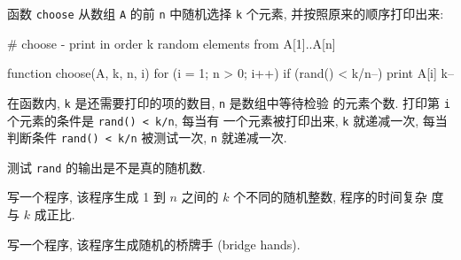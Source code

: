 函数 \texttt{choose} 从数组 \texttt{A} 的前 \texttt{n} 中随机选择
\texttt{k} 个元素, 并按照原来的顺序打印出来:
\begin{awkcode}
    # choose - print in order k random elements from A[1]..A[n]

    function choose(A, k, n,    i) {
        for (i = 1; n > 0; i++)
            if (rand() < k/n--) {
                print A[i]
                k--
            }
    }
\end{awkcode}
在函数内, \texttt{k} 是还需要打印的项的数目, \texttt{n} 是数组中等待检验
的元素个数. 打印第 \texttt{i} 个元素的条件是 \verb'rand() < k/n', 每当有
一个元素被打印出来, \texttt{k} 就递减一次, 每当判断条件 \verb'rand() < k/n'
被测试一次, \texttt{n} 就递减一次.

\begin{exercise}
    测试 \texttt{rand} 的输出是不是真的随机数.
\end{exercise}
\begin{exercise}
    写一个程序, 该程序生成 1 到 $n$ 之间的 $k$ 个不同的随机整数,
    程序的时间复杂 度与 $k$ 成正比.
\end{exercise}
\begin{exercise}
    写一个程序, 该程序生成随机的桥牌手 (bridge hands).
\end{exercise}

